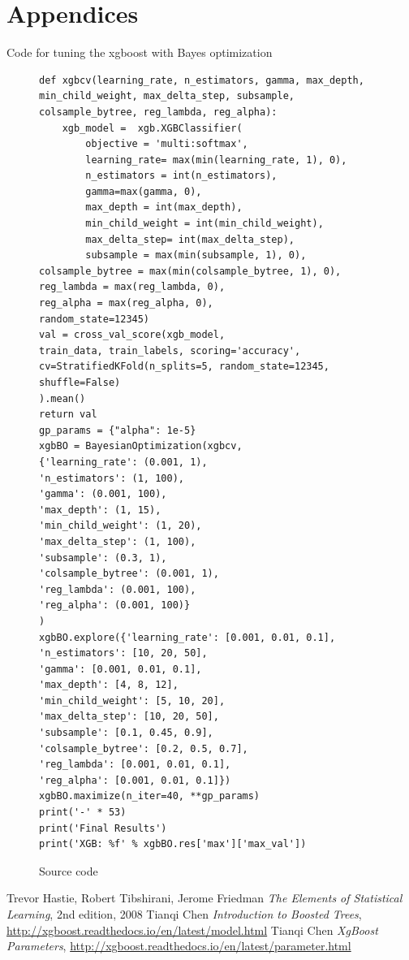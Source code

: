 \documentclass[journal,twocolumn,letterpaper]{IEEEJERM}
\begin{document}
\section{Appendices}
Code for tuning the xgboost with Bayes optimization
\begin{figure}
	\caption{Source code}
\begin{verbatim}
def xgbcv(learning_rate, n_estimators, gamma, max_depth, min_child_weight, max_delta_step, subsample, colsample_bytree, reg_lambda, reg_alpha):
	xgb_model =  xgb.XGBClassifier(
		objective = 'multi:softmax',
		learning_rate= max(min(learning_rate, 1), 0), 
		n_estimators = int(n_estimators),
		gamma=max(gamma, 0), 
		max_depth = int(max_depth),
		min_child_weight = int(min_child_weight),
		max_delta_step= int(max_delta_step),
		subsample = max(min(subsample, 1), 0),
colsample_bytree = max(min(colsample_bytree, 1), 0),
reg_lambda = max(reg_lambda, 0),
reg_alpha = max(reg_alpha, 0),
random_state=12345)
val = cross_val_score(xgb_model,
train_data, train_labels, scoring='accuracy',
cv=StratifiedKFold(n_splits=5, random_state=12345, shuffle=False)
).mean()
return val
gp_params = {"alpha": 1e-5}
xgbBO = BayesianOptimization(xgbcv,
{'learning_rate': (0.001, 1), 
'n_estimators': (1, 100),
'gamma': (0.001, 100),
'max_depth': (1, 15),
'min_child_weight': (1, 20),
'max_delta_step': (1, 100),
'subsample': (0.3, 1),
'colsample_bytree': (0.001, 1),
'reg_lambda': (0.001, 100),
'reg_alpha': (0.001, 100)}
)
xgbBO.explore({'learning_rate': [0.001, 0.01, 0.1], 
'n_estimators': [10, 20, 50],
'gamma': [0.001, 0.01, 0.1],
'max_depth': [4, 8, 12],
'min_child_weight': [5, 10, 20],
'max_delta_step': [10, 20, 50],
'subsample': [0.1, 0.45, 0.9],
'colsample_bytree': [0.2, 0.5, 0.7],
'reg_lambda': [0.001, 0.01, 0.1],
'reg_alpha': [0.001, 0.01, 0.1]})
xgbBO.maximize(n_iter=40, **gp_params)
print('-' * 53)
print('Final Results')
print('XGB: %f' % xgbBO.res['max']['max_val'])
\end{verbatim}
\end{figure}

\begin{thebibliography}{9}
	Trevor Hastie,	Robert Tibshirani,	Jerome Friedman
	\textit{The Elements of Statistical Learning},
	2nd edition,
	2008
	Tianqi Chen
	\textit{Introduction to Boosted Trees},
	\url{http://xgboost.readthedocs.io/en/latest/model.html}	
	Tianqi Chen
	\textit{XgBoost Parameters},
	\url{http://xgboost.readthedocs.io/en/latest/parameter.html}	
\end{thebibliography}
\end{document}
